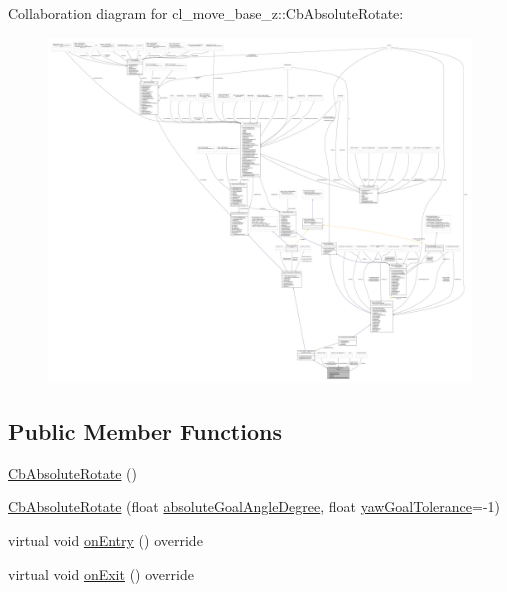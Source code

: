 Collaboration diagram for cl\+\_\+move\+\_\+base\+\_\+z\+:\+:Cb\+Absolute\+Rotate\+:
\nopagebreak
\begin{figure}[H]
\begin{center}
\leavevmode
\includegraphics[width=350pt]{classcl__move__base__z_1_1CbAbsoluteRotate__coll__graph}
\end{center}
\end{figure}
\subsection*{Public Member Functions}
\begin{DoxyCompactItemize}
\item 
\hyperlink{classcl__move__base__z_1_1CbAbsoluteRotate_a378516095c2ad66f52e50f6d7c32678e}{Cb\+Absolute\+Rotate} ()
\item 
\hyperlink{classcl__move__base__z_1_1CbAbsoluteRotate_a33d95123791b68b80b25dae87d8f26d8}{Cb\+Absolute\+Rotate} (float \hyperlink{classcl__move__base__z_1_1CbAbsoluteRotate_ad5d0e21549940444e1cb525cda73329a}{absolute\+Goal\+Angle\+Degree}, float \hyperlink{classcl__move__base__z_1_1CbAbsoluteRotate_a8d8b5b9c2c821efe101bb07c96c4bdd3}{yaw\+Goal\+Tolerance}=-\/1)
\item 
virtual void \hyperlink{classcl__move__base__z_1_1CbAbsoluteRotate_a10418ea360809fa649d295716b152b2b}{on\+Entry} () override
\item 
virtual void \hyperlink{classcl__move__base__z_1_1CbAbsoluteRotate_a0e362b8e9f0d7de5aeee183ba4031437}{on\+Exit} () override
\end{DoxyCompactItemize}
